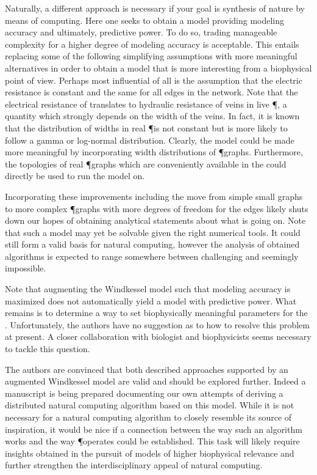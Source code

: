 	Naturally, a different approach is necessary if your goal is synthesis of nature by means of computing. Here one seeks to obtain a model providing modeling accuracy and ultimately, predictive power. To do so, trading manageable complexity for a higher degree of modeling accuracy is acceptable. This entails replacing some of the following simplifying assumptions with more meaningful alternatives in order to obtain a model that is more interesting from a biophysical point of view. Perhaps most influential of all is the assumption that the electric resistance is constant and the same for all edges in the network. Note that the electrical resistance of \Pes translates to hydraulic resistance of veins in live \P, a quantity which strongly depends on the width of the veins. In fact, it is known that the distribution of widths in real \P is not constant but is more likely to follow a gamma or log-normal distribution. Clearly, the model could be made more meaningful by incorporating width distributions of \P graphs. Furthermore, the topologies of real \P graphs which are conveniently available in the \SMGR could directly be used to run the model on.

	Incorporating these improvements including the move from simple small graphs to more complex \P graphs with more degrees of freedom for the edges likely shuts down our hopes of obtaining analytical statements about what is going on. Note that such a model may yet be solvable given the right numerical tools. It could still form a valid basis for natural computing, however the analysis of obtained algorithms is expected to range somewhere between challenging and seemingly impossible.

	Note that augmenting the Windkessel model such that modeling accuracy is maximized does not automatically yield a model with predictive power. What remains is to determine a way to set biophysically meaningful parameters for the \Pes. Unfortunately, the authors have no suggestion as to how to resolve this problem at present. A closer collaboration with biologist and biophysicists seems necessary to tackle this question.

	The authors are convinced that both described approaches supported by an augmented Windkessel model are valid and should be explored further. Indeed a manuscript is being prepared documenting our own attempts of deriving a distributed natural computing algorithm based on this model. While it is not necessary for a natural computing algorithm to closely resemble its source of inspiration, it would be nice if a connection between the way such an algorithm works and the way \P operates could be established. This task will likely require insights obtained in the pursuit of models of higher biophysical relevance and further strengthen the interdisciplinary appeal of natural computing.
